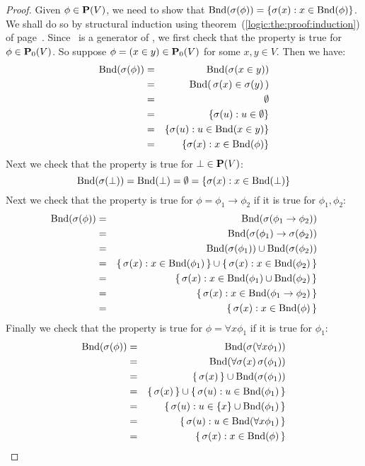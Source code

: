 \begin{proof}
Given $\phi\in\mbox{${\bf P}(V)$}$, we need to show that
$\mbox{\rm Bnd}(\sigma(\phi))=\{\sigma(x):x\in\mbox{\rm Bnd}(\phi)\}$. We shall do
so by structural induction using
theorem~(\ref{logic:the:proof:induction}) of
page~\pageref{logic:the:proof:induction}. Since \pvo\ is a generator
of \pv, we first check that the property is true for $\phi\in\mbox{${\bf P}_{0}(V)$}$.
So suppose $\phi=(x\in y)\in\mbox{${\bf P}_{0}(V)$}$ for some $x,y\in V$. Then we have:
    \begin{eqnarray*}
    \mbox{\rm Bnd}(\sigma(\phi))&=&\mbox{\rm Bnd}(\sigma(x\in y))\\
    &=&\mbox{\rm Bnd}(\,\sigma(x)\in\sigma(y)\,)\\
    &=&\emptyset\\
    &=&\{\sigma(u):u\in\emptyset\}\\
    &=&\{\sigma(u):u\in\mbox{\rm Bnd}(x\in y)\}\\
    &=&\{\sigma(x):x\in\mbox{\rm Bnd}(\phi)\}
    \end{eqnarray*}
Next we check that the property is true for $\bot\in\mbox{${\bf P}(V)$}$:
    \[
    \mbox{\rm Bnd}(\sigma(\bot))=\mbox{\rm Bnd}(\bot)=\emptyset=\{\sigma(x):x\in\mbox{\rm Bnd}(\bot)\}
    \]
Next we check that the property is true for
$\phi=\phi_{1}\to\phi_{2}$ if it is true for $\phi_{1},\phi_{2}$:
    \begin{eqnarray*}
    \mbox{\rm Bnd}(\sigma(\phi))&=&\mbox{\rm Bnd}(\sigma(\phi_{1}\to\phi_{2}))\\
    &=&\mbox{\rm Bnd}(\sigma(\phi_{1})\to\sigma(\phi_{2}))\\
    &=&\mbox{\rm Bnd}(\sigma(\phi_{1}))\cup\mbox{\rm Bnd}(\sigma(\phi_{2}))\\
    &=&\{\,\sigma(x):x\in\mbox{\rm Bnd}(\phi_{1})\,\}\cup\{\,\sigma(x):x\in\mbox{\rm Bnd}(\phi_{2})\,\}\\
    &=&\{\,\sigma(x):x\in\mbox{\rm Bnd}(\phi_{1})\cup\mbox{\rm Bnd}(\phi_{2})\,\}\\
    &=&\{\,\sigma(x):x\in\mbox{\rm Bnd}(\phi_{1}\to\phi_{2})\,\}\\
    &=&\{\,\sigma(x):x\in\mbox{\rm Bnd}(\phi)\,\}
    \end{eqnarray*}
Finally we check that the property is true for $\phi=\forall
x\phi_{1}$ if it is true for $\phi_{1}$:
    \begin{eqnarray*}
    \mbox{\rm Bnd}(\sigma(\phi))&=&\mbox{\rm Bnd}(\sigma(\forall x\phi_{1}))\\
    &=&\mbox{\rm Bnd}(\forall\sigma(x)\,\sigma(\phi_{1}))\\
    &=&\{\,\sigma(x)\,\}\cup\mbox{\rm Bnd}(\sigma(\phi_{1}))\\
    &=&\{\,\sigma(x)\,\}\cup\{\,\sigma(u):u\in\mbox{\rm Bnd}(\phi_{1})\,\}\\
    &=&\{\,\sigma(u):u\in\{x\}\cup\mbox{\rm Bnd}(\phi_{1})\,\}\\
    &=&\{\,\sigma(u):u\in\mbox{\rm Bnd}(\forall x\phi_{1})\,\}\\
    &=&\{\,\sigma(x):x\in\mbox{\rm Bnd}(\phi)\,\}
    \end{eqnarray*}
\end{proof}
